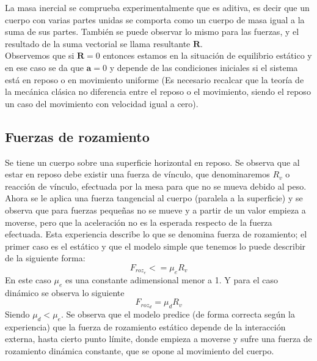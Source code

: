 \documentclass[a4paper]{article}
\numberwithin{equation}{section}
\begin{document}
	La masa inercial se comprueba experimentalmente que es aditiva, es decir que un cuerpo con varias partes unidas se comporta como un cuerpo de masa igual a la suma de sus partes. También se puede observar lo mismo para las fuerzas, y el resultado de la suma vectorial se llama resultante $\boldsymbol{R}$.  \\
	Observemos que si $\boldsymbol{R} = 0$ entonces estamos en la situación de equilibrio estático y en ese caso se da que $\boldsymbol{a} = 0$ y depende de las condiciones iniciales si el sistema está en reposo o en movimiento uniforme (Es necesario recalcar que la teoría de la mecánica clásica no diferencia entre el reposo o el movimiento, siendo el reposo un caso del movimiento con velocidad igual a cero).
	\subsection{Fuerzas de rozamiento}
		Se tiene un cuerpo sobre una superficie horizontal en reposo. Se observa que al estar en reposo debe existir una fuerza de vínculo, que denominaremos $R_v$ o reacción de vínculo, efectuada por la mesa para que no se mueva debido al peso. Ahora se le aplica una fuerza tangencial al cuerpo (paralela a la superficie) y se observa que para fuerzas pequeñas no se mueve y a partir de un valor empieza a moverse, pero que la aceleración no es la esperada respecto de la fuerza efectuada. Esta experiencia describe lo que se denomina fuerza de rozamiento; el primer caso es el estático y que el modelo simple que tenemos lo puede describir de la siguiente forma:
		\begin{equation}
			F_{roz_e} <= \mu_e R_v
		\end{equation}
		En este caso $\mu_e$ es una constante adimensional menor a 1. Y para el caso dinámico se observa lo siguiente
		\begin{equation}
			F_{roz_d} = \mu_d R_v
		\end{equation}
		Siendo $\mu_d < \mu_e$. Se observa que el modelo predice (de forma correcta según la experiencia) que la fuerza de rozamiento estático depende de la interacción externa, hasta cierto punto límite, donde empieza a moverse y sufre una fuerza de rozamiento dinámica constante, que se opone al movimiento del cuerpo.
\end{document}
